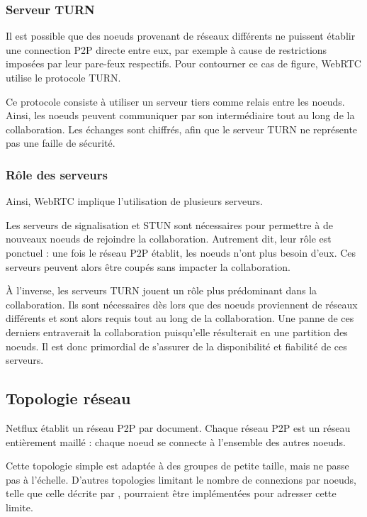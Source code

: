\documentclass[12pt]{thesul}
\begin{document}
\subsubsection{Serveur TURN}

Il est possible que des noeuds provenant de réseaux différents ne puissent établir une connection \ac{P2P} directe entre eux, par exemple à cause de restrictions imposées par leur pare-feux respectifs.
Pour contourner ce cas de figure, \ac{WebRTC} utilise le protocole TURN.

Ce protocole consiste à utiliser un serveur tiers comme relais entre les noeuds.
Ainsi, les noeuds peuvent communiquer par son intermédiaire tout au long de la collaboration.
Les échanges sont chiffrés, afin que le serveur TURN ne représente pas une faille de sécurité.

\subsubsection{Rôle des serveurs}

Ainsi, \ac{WebRTC} implique l'utilisation de plusieurs serveurs.

Les serveurs de signalisation et STUN sont nécessaires pour permettre à de nouveaux noeuds de rejoindre la collaboration.
Autrement dit, leur rôle est ponctuel : une fois le réseau \ac{P2P} établit, les noeuds n'ont plus besoin d'eux.
Ces serveurs peuvent alors être coupés sans impacter la collaboration.

À l'inverse, les serveurs TURN jouent un rôle plus prédominant dans la collaboration.
Ils sont nécessaires dès lors que des noeuds proviennent de réseaux différents et sont alors requis tout au long de la collaboration.
Une panne de ces derniers entraverait la collaboration puisqu'elle résulterait en une partition des noeuds.
Il est donc primordial de s'assurer de la disponibilité et fiabilité de ces serveurs.

\subsection{Topologie réseau}

Netflux établit un réseau \ac{P2P} par document.
Chaque réseau \ac{P2P} est un réseau entièrement maillé : chaque noeud se connecte à l'ensemble des autres noeuds.

Cette topologie simple est adaptée à des groupes de petite taille, mais ne passe pas à l'échelle.
D'autres topologies limitant le nombre de connexions par noeuds, telle que celle décrite par \cite{2018-spray-nedelec}, pourraient être implémentées pour adresser cette limite.
\end{document}
